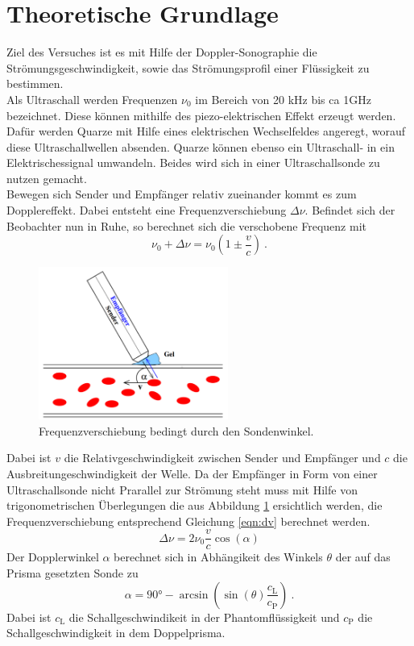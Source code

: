 \section{Theoretische Grundlage}
\label{sec:Theorie}
Ziel des Versuches ist es mit Hilfe der Doppler-Sonographie die Strömungsgeschwindigkeit, sowie das Strömungsprofil einer Flüssigkeit zu bestimmen. \\
Als Ultraschall werden Frequenzen $\nu_0$ im Bereich von 20 kHz bis ca 1GHz bezeichnet. Diese können mithilfe des piezo-elektrischen Effekt erzeugt werden. Dafür werden Quarze mit Hilfe eines elektrischen Wechselfeldes angeregt, worauf diese Ultraschallwellen absenden. Quarze können ebenso ein Ultraschall- in ein Elektrischessignal umwandeln. Beides wird sich in einer Ultraschallsonde zu nutzen gemacht.	\\
Bewegen sich Sender und Empfänger relativ zueinander kommt es zum Dopplereffekt. Dabei entsteht eine Frequenzverschiebung $\Delta \nu$. Befindet sich der Beobachter nun in Ruhe, so berechnet sich die verschobene Frequenz mit
\begin{equation}
  \nu_0 + \Delta \nu = \nu_0 \left( 1 \pm \frac{v}{c} \right) \ .
  \label{}
\end{equation}

\begin{figure}
  \centering
  \includegraphics[height=5cm]{picture/Doppler.pdf}
  \caption{Frequenzverschiebung bedingt durch den Sondenwinkel. \cite[1]{sample}}
  \label{fig:dFre}
\end{figure}

Dabei ist $v$ die Relativgeschwindigkeit zwischen Sender und Empfänger und $c$ die Ausbreitungeschwindigkeit der Welle. Da der Empfänger in Form von einer Ultraschallsonde nicht Prarallel zur Strömung steht muss mit Hilfe von trigonometrischen Überlegungen die aus Abbildung \ref{fig:dFre} ersichtlich werden, die Frequenzverschiebung entsprechend Gleichung \eqref{eqn:dv} berechnet werden.
\begin{equation}
  \Delta \nu = 2 \nu_0 \frac{v}{c} \cos (\alpha)
  \label{eqn:dv}
\end{equation}
Der Dopplerwinkel $\alpha$ berechnet sich in Abhängikeit des Winkels $\theta$ der auf das Prisma gesetzten Sonde zu
\begin{equation}
  \alpha = 90° - \arcsin\left( \sin(\theta) \frac{c_\text{L}}{c_\text{P}} \right) \ .
  \label{eqn:alpha}
\end{equation}
Dabei ist $c_\text{L}$ die Schallgeschwindikeit in der Phantomflüssigkeit und $c_\text{P}$ die Schallgeschwindigkeit in dem Doppelprisma.
